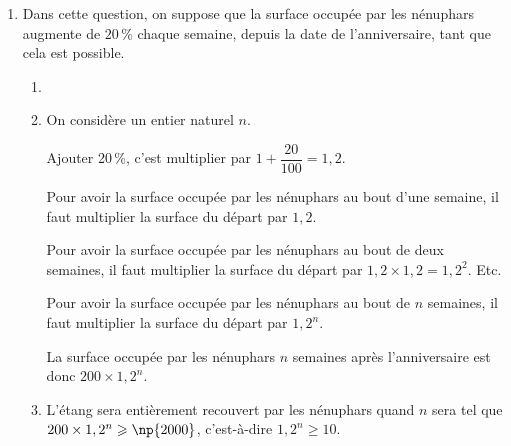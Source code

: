 \begin{enumerate}
\begin{enumerate}
		\item%
L'étang sera  entièrement recouvert de nénuphars quand la surface des nénuphars aura atteint ~m$^2$, c'est-à-dire quand la surface des nénuphars aura augmenté de ~m$^2$.

$\dfrac{\np{1800}}{40}=45$; il faudra donc 45 semaines pour que l'étang soit entièrement recouvert de nénuphars.
		
		
	\end{enumerate}
\item Dans cette question, on suppose que la surface occupée par les nénuphars augmente de $20\,\%$ chaque semaine, depuis la date de l'anniversaire, tant que cela est possible.
	\begin{enumerate}
		\item %
		
		\item On considère un entier naturel $n$. %
		
Ajouter 20\,\%, c'est multiplier par $1+\dfrac{20}{100}=1,2$.

Pour avoir la surface occupée par les nénuphars au bout d'une semaine, il faut multiplier la surface du départ par $1,2$.
		
Pour avoir la surface occupée par les nénuphars au bout de deux semaines, il faut multiplier la surface du départ par $1,2\times 1,2=1,2^2$. Etc.

Pour avoir la surface occupée par les nénuphars au bout de $n$ semaines, il faut multiplier la surface du départ par $1,2^n$.
		
La surface occupée par les nénuphars $n$ semaines après l'anniversaire est donc
$200\times 1,2^n$.
		
		\item %
L'étang sera entièrement recouvert par les nénuphars quand $n$ sera tel que $200\times 1,2^n \geqslant \np{2000}$, c'est-à-dire $1,2^n \geqslant 10$.


\end{enumerate}
\end{enumerate}
